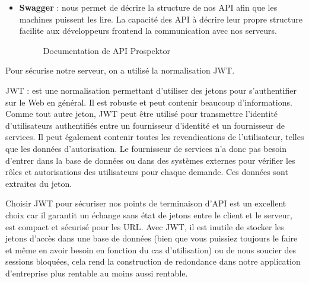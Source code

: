 \begin{itemize}
\begin{itemize}
\item Les d\'eveloppeurs adorent programmer avec Spring Boot. Ils sont plus productifs, b\'en\'eficient des avantages de l'\'ecosyst\`eme Spring et de la tranquillit\'e d'esprit des syst\`emes de production en fonctionnement.
\end{itemize}


\item \textbf{Swagger} : nous permet de d\'ecrire la structure de nos \gls{API} afin que les machines puissent les lire. La capacit\'e des \gls{API} \`a d\'ecrire leur propre structure facilite aux d\'eveloppeurs frontend la communication avec nos serveurs.

\begin{figure}[H]
	\caption{\label{fig:my-label} Documentation de \gls{API} Prospektor}
\end{figure}

\end{itemize}

Pour s\'ecurise notre serveur, on a utilis\'e la normalisation \gls{JWT}.

\gls{JWT} : est une normalisation permettant d'utiliser des jetons pour s'authentifier sur le Web en g\'en\'eral. Il est robuste et peut contenir beaucoup d'informations. Comme tout autre jeton, \gls{JWT} peut \^etre utilis\'e pour transmettre l'identit\'e d'utilisateurs authentifi\'es entre un fournisseur d'identit\'e et un fournisseur de services. Il peut \'egalement contenir toutes les revendications de l'utilisateur, telles que les donn\'ees d'autorisation. Le fournisseur de services n'a donc pas besoin d'entrer dans la base de donn\'ees ou dans des syst\`emes externes pour v\'erifier les r\^oles et autorisations des utilisateurs pour chaque demande. Ces donn\'ees sont extraites du jeton.

Choisir \gls{JWT} pour s\'ecuriser nos points de terminaison d'\gls{API} est un excellent choix car il garantit un \'echange sans \'etat de jetons entre le client et le serveur, est compact et s\'ecuris\'e pour les \gls{URL}. Avec \gls{JWT}, il est inutile de stocker les jetons d'acc\`es dans une base de donn\'ees (bien que vous puissiez toujours le faire et m\^eme en avoir besoin en fonction du cas d'utilisation) ou de nous soucier des sessions bloqu\'ees, cela rend la construction de redondance dans notre application d'entreprise plus rentable au moins aussi rentable. 

